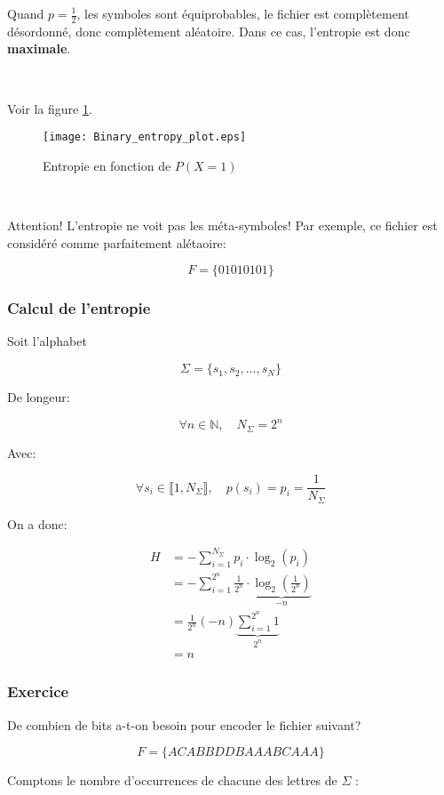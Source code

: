 \documentclass[a4paper,11pt]{article}
\newcommand{\N}{\mathbb{N}}
\newcommand{\ti}{\cdot}
\begin{document}
Quand $p = \frac{1}{2}$, les symboles sont équiprobables, le fichier est
complètement désordonné, donc complètement aléatoire. Dans ce cas, l'entropie
est donc \textbf{maximale}.

\

Voir la figure \ref{entropy_prob}.

\begin{figure}[!h]
  \centering
  \texttt{[image: Binary\_entropy\_plot.eps]}
  \caption{Entropie en fonction de $P(X = 1)$}
  \label{entropy_prob}
\end{figure}

\

Attention! L'entropie ne voit pas les méta-symboles! Par exemple, ce fichier
est considéré comme parfaitement alétaoire:

$$ F = \{01010101\} $$

\subsubsection{Calcul de l'entropie}

Soit l'alphabet

$$ \Sigma = \{s_1, s_2, ..., s_N\} $$

De longeur:

$$ \forall n \in \N, \quad N_{\Sigma}= 2^n $$

Avec:

$$ \forall s_i \in \llbracket 1, N_{\Sigma} \rrbracket, \quad p(s_i) = p_i = \frac{1}{N_{\Sigma}} $$

On a donc:

\begin{align*}
  H &= - \sum_{i = 1}^{N_{\Sigma}}p_i \ti \log_2(p_i) \\
    &= - \sum_{i = 1}^{2^n} \frac{1}{2^n} \ti \underbrace{\log_2\left(\frac{1}{2^n} \right)}_{- n} \\
    &= \frac{1}{2^n} (-n) \underbrace{\sum_{i = 1}^{2^n} 1}_{2^n} \\
    &= n
\end{align*}

\subsubsection{Exercice}

De combien de bits a-t-on besoin pour encoder le fichier suivant?

$$ F = \{ACABBDDBAAABCAAA\} $$

Comptons le nombre d'occurrences de chacune des lettres de $\Sigma$ :
\end{document}
